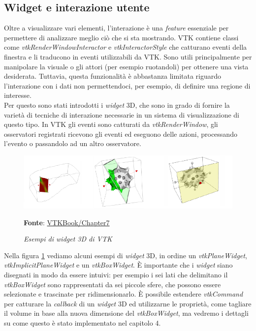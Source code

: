 \subsection{Widget e interazione utente}\label{sec:widget-interazione}
Oltre a visualizzare vari elementi, l'interazione è una \emph{feature} essenziale per permettere di analizzare meglio ciò che si sta mostrando. VTK contiene classi come \emph{vtkRenderWindowInteractor} e \emph{vtkInteractorStyle} che catturano eventi della finestra e li traducono in eventi utilizzabili da VTK. Sono utili principalmente per manipolare la visuale o gli attori (per esempio ruotandoli) per ottenere una vista desiderata. Tuttavia, questa funzionalità è abbastanza limitata riguardo l'interazione con i dati non permettendoci, per esempio, di definire una regione di interesse.\\
Per questo sono stati introdotti i \emph{widget} 3D, che sono in grado di fornire la varietà di tecniche di interazione necessarie in un sistema di visualizzazione di questo tipo. In VTK gli eventi sono catturati da \emph{vtkRenderWindow}, gli osservatori registrati ricevono gli eventi ed eseguono delle azioni, processando l'evento o passandolo ad un altro osservatore.

\begin{figure}[h]
    \centering
    \includegraphics[scale=0.5]{immagini/volumerendering/widgets.png}
    \caption{\textit{Esempi di widget 3D di VTK}}
    \textbf{Fonte}: \href{https://lorensen.github.io/VTKExamples/site/VTKBook/07Chapter7/}{VTKBook/Chapter7}
    \label{fig: VTK 3D Widgets}
\end{figure}

Nella figura \ref{fig: VTK 3D Widgets} vediamo alcuni esempi di \emph{widget} 3D, in ordine un \emph{vtkPlaneWidget}, \emph{vtkImplicitPlaneWidget} e un \emph{vtkBoxWidget}. \`E importante che i \emph{widget} siano disegnati in modo da essere intuivi: per esempio i sei lati che delimitano il \emph{vtkBoxWidget} sono rappresentati da sei piccole sfere, che possono essere selezionate e trascinate per ridimensionarlo. \`E possibile estendere \emph{vtkCommand} per catturare la \emph{callback} di un \emph{widget} 3D ed utilizzarne le proprietà, come tagliare il volume in base alla nuova dimensione del \emph{vtkBoxWidget}, ma vedremo i dettagli su come questo è stato implementato nel capitolo 4.

